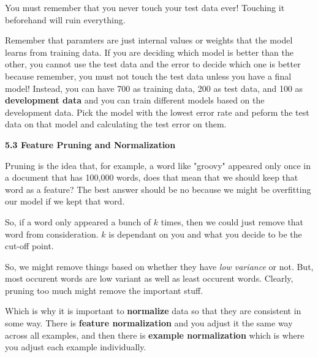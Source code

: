 \documentclass{article}
\begin{document}
\vspace{0.5cm}

You must remember that you never touch your test data ever! Touching it beforehand will ruin everything.

\vspace{0.5cm}

Remember that paramters are just internal values or weights that the model learns from training data. If you are deciding which model is better than the other, you cannot use the test data and the error to decide which one is better because remember, you must not touch the test data unless you have a final model! Instead, you can have 700 as training data, 200 as test data, and 100 as \textbf{development data} and you can train different models based on the development data. Pick the model with the lowest error rate and peform the test data on that model and calculating the test error on them.

\vspace{0.5cm}

\newpage

\LARGE \textbf{5.3 Feature Pruning and Normalization}

\vspace{0.5cm}

\large Pruning is the idea that, for example, a word like "groovy" appeared only once in a document that has 100,000 words, does that mean that we should keep that word as a feature? The best answer should be no because we might be overfitting our model if we kept that word.

\vspace{0.5cm}

So, if a word only appeared a bunch of $k$ times, then we could just remove that word from consideration. $k$ is dependant on you and what you decide to be the cut-off point.

\vspace{0.5cm}

So, we might remove things based on whether they have \textit{low variance} or not. But, most occurent words are low variant as well as least occurent words. Clearly, pruning too much might remove the important stuff.

\vspace{0.5cm}

Which is why it is important to \textbf{normalize} data so that they are consistent in some way. There is \textbf{feature normalization} and you adjust it the same way across all examples, and then there is \textbf{example normalization} which is where you adjust each example individually.
\end{document}

